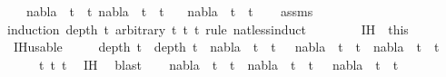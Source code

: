 \begin{isabellebody}
\ \ \ {\isachardoublequoteopen}nabla\ {\isasymturnstile}\ t{}\ {\isasymapprox}\ t{}{\isachardoublequoteclose}\ {\isachardoublequoteopen}nabla\ {\isasymturnstile}\ t{}\ {\isasymapprox}\ t{}{\isachardoublequoteclose}\isanewline
\ \ \ {\isachardoublequoteopen}nabla\ {\isasymturnstile}\ t{}\ {\isasymapprox}\ t{}{\isachardoublequoteclose}\isanewline
%
\isadelimproof
\ \ %
\endisadelimproof
%
\isatagproof
{}\isamarkupfalse%
\ assms\isanewline
{}\isamarkupfalse%
{\isacharparenleft}{\kern0pt}induction\ {\isacartoucheopen}depth\ t{}{\isacartoucheclose}\ arbitrary{\isacharcolon}{\kern0pt}\ t{}\ t{}\ t{}\ rule{\isacharcolon}{\kern0pt}\ nat{\isacharunderscore}{\kern0pt}less{\isacharunderscore}{\kern0pt}induct{\isacharparenright}{\kern0pt}\isanewline
\ \ \isamarkupfalse%
\ {}\isanewline
\ \ \isamarkupfalse%
\ IH\ {\isacharequal}{\kern0pt}\ this\isanewline
\ \ \isamarkupfalse%
\ IH{\isacharunderscore}{\kern0pt}usable{\isacharcolon}{\kern0pt}\ \isanewline
\ \ \ \ {\isachardoublequoteopen}depth\ t{}{\isacharprime}{\kern0pt}\ {\isacharless}{\kern0pt}\ depth\ t{}\ {\isasymLongrightarrow}\ nabla\ {\isasymturnstile}\ t{}{\isacharprime}{\kern0pt}\ {\isasymapprox}\ t{}{\isacharprime}{\kern0pt}\ {\isasymLongrightarrow}\ \ nabla\ {\isasymturnstile}\ t{}{\isacharprime}{\kern0pt}\ {\isasymapprox}\ t{}{\isacharprime}{\kern0pt}\ {\isasymLongrightarrow}\ nabla\ {\isasymturnstile}\ t{}{\isacharprime}{\kern0pt}\ {\isasymapprox}\ t{}{\isacharprime}{\kern0pt}{\isachardoublequoteclose}\isanewline
\ \ \ \ \ t{}{\isacharprime}{\kern0pt}\ t{}{\isacharprime}{\kern0pt}\ t{}{\isacharprime}{\kern0pt}\ \isamarkupfalse%
\ IH\ \isamarkupfalse%
\ blast\isanewline
\ \ \isamarkupfalse%
\ {\isachardoublequoteopen}nabla\ {\isasymturnstile}\ t{}\ {\isasymapprox}\ t{}\ {\isasymLongrightarrow}\ nabla\ {\isasymturnstile}\ t{}\ {\isasymapprox}\ t{}\ {\isasymLongrightarrow}\ \ nabla\ {\isasymturnstile}\ t{}\ {\isasymapprox}\ t{}{\isachardoublequoteclose}\isanewline
\ \ \isamarkupfalse%
{\isacharminus}{\kern0pt}\isanewline
\ \ \ \ \isamarkupfalse%

\end{isabellebody}
